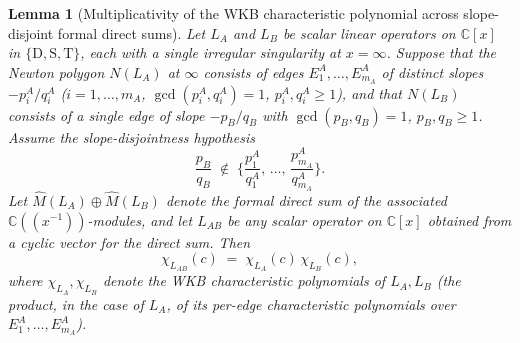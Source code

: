 \documentclass[aip,jmp,preprint,amsmath,amssymb,nofootinbib,floatfix]{revtex4-2}
\theoremstyle{plain}
\newtheorem{lemma}[theorem]{Lemma}
\theoremstyle{definition}
\theoremstyle{remark}
\newcommand{\opD}{\mathrm{D}}                     %
\newcommand{\opS}{\mathrm{S}}                     %
\newcommand{\opT}{\mathrm{T}}                     %
\begin{document}
\begin{lemma}[Multiplicativity of the WKB characteristic polynomial
across slope-disjoint formal direct sums]\label{lem:chi-multiplicative}
Let $L_A$ and $L_B$ be scalar linear operators on $\mathbb{C}[x]$ in
$\{\opD, \opS, \opT\}$, each with a single irregular singularity at
$x = \infty$. Suppose that the Newton polygon $N(L_A)$ at $\infty$
consists of edges $E_1^A, \dots, E_{m_A}^A$ of distinct slopes
$-p_i^A / q_i^A$ ($i = 1, \dots, m_A$, $\gcd(p_i^A, q_i^A) = 1$,
$p_i^A, q_i^A \ge 1$), and that $N(L_B)$ consists of a \emph{single}
edge of slope $-p_B / q_B$ with $\gcd(p_B, q_B) = 1$, $p_B, q_B \ge 1$.
Assume the slope-disjointness hypothesis
\begin{equation}\label{eq:slope-disjoint}
   \frac{p_B}{q_B} \;\notin\; \Big\{\frac{p_1^A}{q_1^A},\,
   \dots,\, \frac{p_{m_A}^A}{q_{m_A}^A}\Big\}.
\end{equation}
Let $\widehat{M}(L_A) \oplus \widehat{M}(L_B)$ denote the formal direct
sum of the associated $\mathbb{C}((x^{-1}))$-modules, and let $L_{AB}$
be any scalar operator on $\mathbb{C}[x]$ obtained from a cyclic vector
for the direct sum. Then
\[
   \chi_{L_{AB}}(c) \;=\; \chi_{L_A}(c)\, \chi_{L_B}(c),
\]
where $\chi_{L_A}, \chi_{L_B}$ denote the WKB characteristic polynomials
of $L_A, L_B$ (the product, in the case of $L_A$, of its per-edge
characteristic polynomials over $E_1^A, \dots, E_{m_A}^A$).
\end{lemma}
\end{document}
